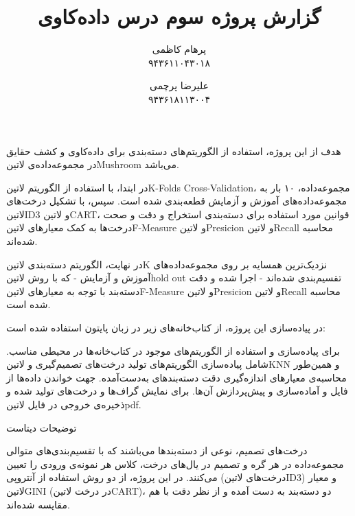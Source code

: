 \documentclass[a4paper,12pt]{article}
\title{گزارش پروژه سوم درس داده‌کاوی}
\author{
پرهام کاظمی \\ ۹۴۳۶۱۱۰۴۳۰۱۸
\and
علیرضا پرچمی \\ ۹۴۳۶۱۸۱۱۳۰۰۴
}
\begin{document}
	\maketitle
	

هدف از این پروژه، استفاده از الگوریتم‌های دسته‌بندی  برای داده‌کاوی و کشف حقایق در مجموعه‌داده‌ی ‌لاتین{Mushroom} می‌باشد.

در ابتدا، با استفاده از الگوریتم ‌لاتین{K-Folds Cross-Validation}، مجموعه‌داده، ۱۰ بار به مجموعه‌داده‌های آموزش و آزمایش قطعه‌بندی شده است. سپس، با تشکیل درخت‌های ‌لاتین{ID3} و ‌لاتین{CART}، قوانین مورد استفاده برای دسته‌بندی استخراج و دقت و صحت درخت‌ها به کمک معیارهای ‌لاتین{F-Measure} و ‌لاتین{Presicion} و ‌لاتین{Recall} محاسبه شده‌اند. 

در نهایت، الگوریتم دسته‌بندی ‌لاتین{K} نزدیک‌ترین همسایه  بر روی مجموعه‌داده‌های آموزش و آزمایش - که با روش ‌لاتین{hold out} تقسیم‌بندی شده‌اند - اجرا شده و دقت دسته‌بند با توجه به معیارهای  ‌لاتین{F-Measure} و ‌لاتین{Presicion} و ‌لاتین{Recall} محاسبه شده‌ است.
	
	
	در پیاده‌سازی این پروژه، از کتاب‌خانه‌های زیر در زبان پایتون استفاده شده است:
	
		  برای پیاده‌سازی و استفاده از الگوریتم‌های موجود در کتاب‌خانه‌ها در محیطی مناسب.
		 شامل پیاده‌سازی الگوریتم‌های تولید درخت‌های تصمیم‌گیری و ‌لاتین{KNN} و همین‌طور محاسبه‌ی معیارهای اندازه‌گیری دقت دسته‌بندهای به‌دست‌آمده.
		 جهت خواندن داده‌ها از فایل و آماده‌سازی و پیش‌پردازش آن‌ها.
		 برای نمایش گراف‌ها و درخت‌های تولید شده و ذخیره‌ی خروجی در فایل ‌لاتین{pdf}.
	
	
	توضیحات دیتاست
	
	
	درخت‌های تصمیم، نوعی از دسته‌بندها می‌باشند که با تقسیم‌بندی‌های متوالی مجموعه‌داده در هر گره و تصمیم در یال‌های درخت، کلاس هر نمونه‌ی ورودی را تعیین می‌کنند. در این پروژه، از دو روش استفاده از آنتروپی (درخت‌های ‌لاتین{ID3}) و معیار ‌لاتین{GINI} (در درخت ‌لاتین{CART})، دو دسته‌بند به دست آمده و از نظر دقت با هم مقایسه شده‌اند.
	
\end{document}
